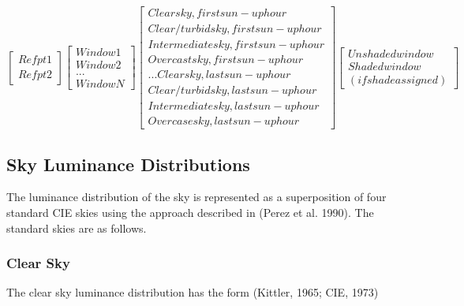 \begin{equation}
\left[
    \begin{array}{c}
      Ref pt 1 \\
      Ref pt 2
    \end{array}
  \right]
  \left[
    \begin{array}{c}
      Window 1 \\
      Window 2 \\
      ... \\
      Window N
    \end{array}
  \right]
  \left[
    \begin{array}{c}
      Clear sky, first sun-up hour \\
      Clear/turbid sky, first sun-up hour \\
      Intermediate sky, first sun-up hour \\
      Overcast sky, first sun-up hour \\
      ...
      Clear sky, last sun-up hour \\
      Clear/turbid sky, last sun-up hour \\
      Intermediate sky, last sun-up hour \\
      Overcase sky, last sun-up hour
    \end{array}
   \right]
   \left[
     \begin{array}{c}
       Unshaded window \\
       Shaded window \\
       (if shade assigned)
     \end{array}
   \right]
\end{equation}

\subsection{Sky Luminance Distributions}\label{sky-luminance-distributions}

The luminance distribution of the sky is represented as a superposition of four standard CIE skies using the approach described in (Perez et al. 1990). The standard skies are as follows.

\subsubsection{Clear Sky}\label{clear-sky}

The clear sky luminance distribution has the form (Kittler, 1965; CIE, 1973)

